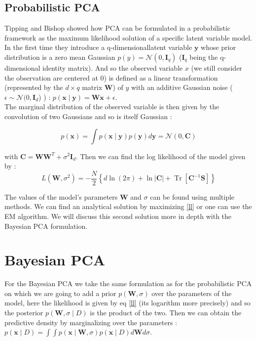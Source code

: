 \documentclass{article}
\begin{document}
\subsection{Probabilistic PCA}

Tipping and Bishop \cite{tipping1999ppca} showed how PCA can be formulated in a probabilistic framework as the maximum likelihood solution of a specific latent variable model.\\
In the first time they introduce a q-dimensionallatent variable $\mathbf{y}$ whose prior distribution is a zero mean Gaussian $p(y) = \mathcal{N}(0,\mathbf{I}_q) $ ($\mathbf{I}_q$ being the q-dimensional identity matrix). And so the observed variable $x$ (we still consider the observation are centered at 0) is defined as a linear transformation (represented by the $d \times q$ matrix $\mathbf{W}$) of $y$ with an additive Gaussian noise ($\epsilon \sim \mathcal{N}(0,\mathbf{I}_d$) )  : $p(\mathbf{x} \mid \mathbf{y}) = \mathbf{W} \mathbf{x} + \epsilon$.\\
The marginal distribution of the observed variable is then given by the convolution of two Gaussians and so is itself Gaussian :

$$p(\mathbf{x})=\int p(\mathbf{x} \mid \mathbf{y}) p(\mathbf{y}) d \mathbf{y}=\mathcal{N}(0, \mathbf{C})$$

with $\mathbf{C} = \mathbf{W} \mathbf{W}^T + \sigma^2 \mathbf{I}_d $. Then we can find the log likelihood of the model given by  :
\begin{equation}
    L\left(\mathbf{W}, \sigma^{2}\right)=-\frac{N}{2}\left\{d \ln (2 \pi)+\ln |\mathbf{C}|+\operatorname{Tr}\left[\mathbf{C}^{-1} \mathbf{S}\right]\right\}
    \label{ll}
\end{equation}

The values of the model's parameters $\mathbf{W}$ and $\sigma$ can be found using multiple methods. We can find an analytical solution by maximizing \ref{ll} or one can use the EM algorithm. We will discuss this second solution more in depth with the Bayesian PCA formulation.

\section{Bayesian PCA}

For the Bayesian PCA we take the same formulation as for the probabilistic PCA on which we are going to add a prior $p(\mathbf{W},\sigma)$ over the parameters of the model, here the likelihood is given by eq \ref{ll} (its logarithm more precisely) and so the posterior $p(\mathbf{W},\sigma\mid D)$ is the product of the two. Then we can obtain the predictive density by marginalizing over the parameters : $p(\mathbf{x} \mid D) = \int \int p(\mathbf{x} \mid \mathbf{W},\sigma) p(\mathbf{x} \mid D) d\mathbf{W} d \sigma$.\\
\end{document}

